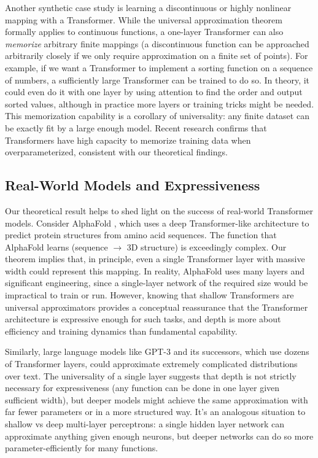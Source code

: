 \documentclass[conference]{IEEEtran}
\begin{document}
Another synthetic case study is learning a discontinuous or highly nonlinear mapping with a Transformer. While the universal approximation theorem formally applies to continuous functions, a one-layer Transformer can also \emph{memorize} arbitrary finite mappings (a discontinuous function can be approached arbitrarily closely if we only require approximation on a finite set of points). For example, if we want a Transformer to implement a sorting function on a sequence of numbers, a sufficiently large Transformer can be trained to do so. In theory, it could even do it with one layer by using attention to find the order and output sorted values, although in practice more layers or training tricks might be needed. This memorization capability is a corollary of universality: any finite dataset can be exactly fit by a large enough model. Recent research confirms that Transformers have high capacity to memorize training data when overparameterized, consistent with our theoretical findings.

\subsection{Real-World Models and Expressiveness}
Our theoretical result helps to shed light on the success of real-world Transformer models. Consider AlphaFold \cite{jumper2021}, which uses a deep Transformer-like architecture to predict protein structures from amino acid sequences. The function that AlphaFold learns (sequence $\to$ 3D structure) is exceedingly complex. Our theorem implies that, in principle, even a single Transformer layer with massive width could represent this mapping. In reality, AlphaFold uses many layers and significant engineering, since a single-layer network of the required size would be impractical to train or run. However, knowing that shallow Transformers are universal approximators provides a conceptual reassurance that the Transformer architecture is expressive enough for such tasks, and depth is more about efficiency and training dynamics than fundamental capability.

Similarly, large language models like GPT-3 \cite{brown2020} and its successors, which use dozens of Transformer layers, could approximate extremely complicated distributions over text. The universality of a single layer suggests that depth is not strictly necessary for expressiveness (any function can be done in one layer given sufficient width), but deeper models might achieve the same approximation with far fewer parameters or in a more structured way. It's an analogous situation to shallow vs deep multi-layer perceptrons: a single hidden layer network can approximate anything given enough neurons, but deeper networks can do so more parameter-efficiently for many functions.
\end{document}
